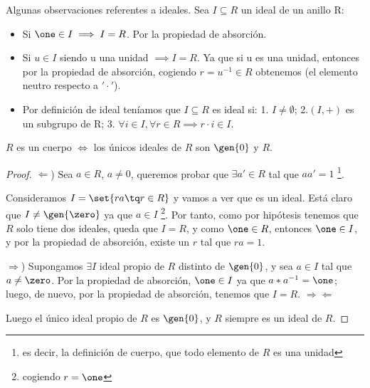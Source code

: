 Algunas observaciones referentes a ideales. Sea $I \subseteq R$ un ideal de un anillo R:
\begin{itemize}
	\item Si $\one \in I \implies I=R$. Por la propiedad de absorción.
	\item Si $u\in I$ siendo u una unidad $\implies I=R$. Ya que si u es una unidad, entonces por la propiedad de absorción, cogiendo $r=u^{-1} \in R$ obtenemos \one (el elemento neutro respecto a $'\cdot'$).
	\item Por definición de ideal teníamos que $I \subseteq R$ es ideal si: 1. $I \neq \emptyset$; 2.$(I, +)$ es un subgrupo de R; 3. $\forall i \in I, \forall r \in R \implies r\cdot i \in I$.

\end{itemize}
\begin{prop}
	$R$ es un cuerpo $\iff$ los únicos ideales de $R$ son $\gen{0}$ y $R$.
\end{prop}
\begin{proof}

	$\Leftarrow$) Sea $a \in R$, $a \neq 0$, queremos probar que $\exists a' \in R$ tal que $aa' = 1$ \footnote{es decir, la definición de cuerpo, que todo elemento de $R$ es una unidad}.

	Consideramos $I=\set{ra \tq r \in R}$ y vamos a ver que es un ideal. Está claro que $I \neq \gen{\zero}$ ya que $a \in I$ \footnote{cogiendo $r = \one$}. Por tanto, como por hipótesis tenemos que $R$ solo tiene dos ideales, queda que $I=R$, y como $\one \in R$, entonces $\one \in I$, y por la propiedad de absorción, existe un $r$ tal que $ra=1$.

	$\Rightarrow$) Supongamos $\exists I$ ideal propio de $R$ distinto de $\gen{0}$, y sea $a \in I$ tal que $a \neq \zero$. Por la propiedad de absorción, $\one \in I$ ya que $a*a^{-1} = \one$; luego, de nuevo, por la propiedad de absorción, tenemos que $I = R$. $\Rightarrow\Leftarrow$

	Luego el único ideal propio de $R$ es $\gen{0}$, y $R$ siempre es un ideal de $R$.
\end{proof}

